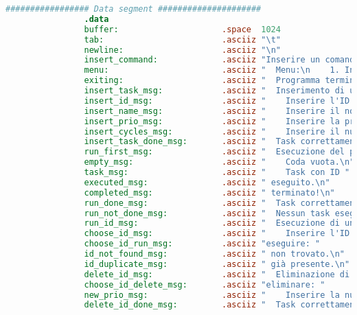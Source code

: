 \begin{center}
\begin{lstlisting}[language=mips, gobble=14, stepnumber=1]
                ################# Data segment #####################
                .data
                buffer:                     .space  1024
                tab:                        .asciiz "\t"
                newline:                    .asciiz "\n"
                insert_command:             .asciiz "Inserire un comando (INVIO stampa il menu): "
                menu:                       .asciiz "  Menu:\n    1. Inserisci un nuovo task;\n    2. Esegui il task in testa alla coda;\n    3. Esegui un task specifico;\n    4. Elimina un task specifico;\n    5. Modifica la priorità di un task specifico;\n    6. Cambia politica di scheduling;\n    7. Termina il programma.\n\n"
                exiting:                    .asciiz "  Programma terminato."
                insert_task_msg:            .asciiz "  Inserimento di un nuovo task.\n"
                insert_id_msg:              .asciiz "    Inserire l'ID del task: "
                insert_name_msg:            .asciiz "    Inserire il nome del task (max 8 caratteri): "
                insert_prio_msg:            .asciiz "    Inserire la priorità del task (min 0, max 9): "
                insert_cycles_msg:          .asciiz "    Inserire il numero di cicli di CPU del task (min 1, max 99): "
                insert_task_done_msg:       .asciiz "  Task correttamente inserito!\n\n"
                run_first_msg:              .asciiz "  Esecuzione del primo task.\n"
                empty_msg:                  .asciiz "    Coda vuota.\n"
                task_msg:                   .asciiz "    Task con ID "
                executed_msg:               .asciiz " eseguito.\n"
                completed_msg:              .asciiz " terminato!\n"
                run_done_msg:               .asciiz "  Task correttamente eseguito!\n\n"
                run_not_done_msg:           .asciiz "  Nessun task eseguito!\n\n"
                run_id_msg:                 .asciiz "  Esecuzione di un task specifico.\n"
                choose_id_msg:              .asciiz "    Inserire l'ID del task da "
                choose_id_run_msg:          .asciiz "eseguire: "
                id_not_found_msg:           .asciiz " non trovato.\n"
                id_duplicate_msg:           .asciiz " già presente.\n"
                delete_id_msg:              .asciiz "  Eliminazione di un task specifico.\n"
                choose_id_delete_msg:       .asciiz "eliminare: "
                new_prio_msg:               .asciiz "    Inserire la nuova priorità del task (min 0, max 9): "
                delete_id_done_msg:         .asciiz "  Task correttamente eliminato!\n\n"

\end{lstlisting}
\end{center}
